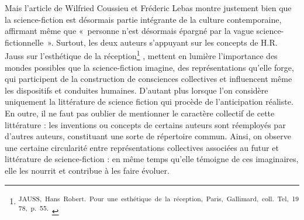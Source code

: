 \documentclass[letterpaper,portrait,12pt]{article}
\begin{document}
	Mais l'article de Wilfried Coussieu et Fr\'{e}deric Lebas montre justement bien que la science-fiction est d\'{e}sormais partie int\'{e}grante de la culture contemporaine, affirmant m\^{e}me que « personne n'est d\'{e}sormais \'{e}pargn\'{e} par la vague science-fictionnelle ». Surtout, les deux auteurs s'appuyant sur les concepts de H.R. Jauss sur l'esth\'{e}tique de la r\'{e}ception\footnote{\textsuperscript{\newpage
}\textsuperscript{	JAUSS,\ Hans\ Robert.\ Pour\ une\ esth\'{e}tique\ de\ la\ r\'{e}ception,\ Paris,\ Gallimard,\ coll.\ Tel,\ 1978,\ p.\ 55.\ }} , mettent en lumi\`{e}re l'importance des mondes possibles que la science-fiction imagine, des repr\'{e}sentations qu'elle forge, qui participent de la construction de consciences collectives et influencent m\^{e}me les dispositifs et conduites humaines. D'autant plus lorsque l'on consid\`{e}re uniquement la litt\'{e}rature de science fiction qui proc\`{e}de de l'anticipation r\'{e}aliste. En outre, il ne faut pas oublier de mentionner le caract\`{e}re collectif de cette litt\'{e}rature : les inventions ou concepts de certains auteurs sont r\'{e}employ\'{e}s par d'autres auteurs, constituant une sorte de r\'{e}pertoire commun. Ainsi, on observe une certaine circularit\'{e} entre repr\'{e}sentations collectives associ\'{e}es au futur et litt\'{e}rature de science-fiction : en m\^{e}me temps qu'elle t\'{e}moigne de ces imaginaires, elle les nourrit et contribue \`{a} les faire \'{e}voluer.
\end{document}
